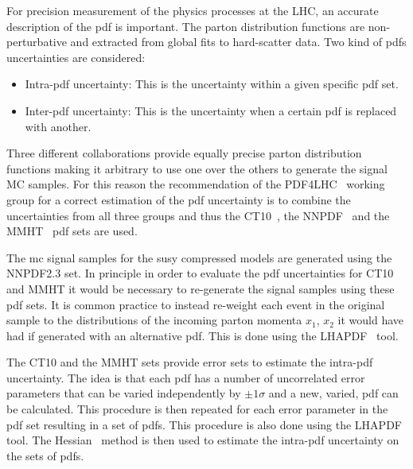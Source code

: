 For precision measurement of the physics processes at the LHC, an accurate
description of the \gls{pdf} is important. The parton distribution functions are
non-perturbative and extracted from global fits to hard-scatter data. Two kind
of \glspl{pdf} uncertainties are considered:
\begin{itemize}
\item Intra-\gls{pdf} uncertainty: This is the uncertainty within a given
  specific \gls{pdf} set.
\item Inter-\gls{pdf} uncertainty: This is the uncertainty when a certain
  \gls{pdf} is replaced with another.
\end{itemize}
Three different collaborations provide equally precise parton distribution
functions making it arbitrary to use one over the others to generate the signal
MC samples. For this reason the recommendation of the PDF4LHC~\cite{PDF4LHC}
working group for a correct estimation of the \gls{pdf} uncertainty is to
combine the uncertainties from all three groups and thus the CT10~\cite{CT10},
the NNPDF~\cite{NNPDF} and the MMHT~\cite{MMHT} \gls{pdf} sets are used.

The \gls{mc} signal samples for the \gls{susy} compressed models are generated
using the NNPDF2.3 set. In principle in order to evaluate the \gls{pdf}
uncertainties for CT10 and MMHT it would be necessary to re-generate the signal
samples using these \gls{pdf} sets. It is common practice to instead re-weight
each event in the original sample to the distributions of the incoming parton
momenta $x_1$, $x_2$ it would have had if generated with an alternative
\gls{pdf}. This is done using the LHAPDF~\cite{LHAPDF} tool.

The CT10 and the MMHT sets provide error sets to estimate the intra-\gls{pdf}
uncertainty. The idea is that each \gls{pdf} has a number of uncorrelated error
parameters that can be varied independently by $\pm 1\sigma$ and a new, varied,
\gls{pdf} can be calculated. This procedure is then repeated for each error
parameter in the \gls{pdf} set resulting in a set of \glspl{pdf}. This procedure
is also done using the LHAPDF tool. The Hessian~\cite{Hessian} method is then
used to estimate the intra-\gls{pdf} uncertainty on the sets of \glspl{pdf}.


